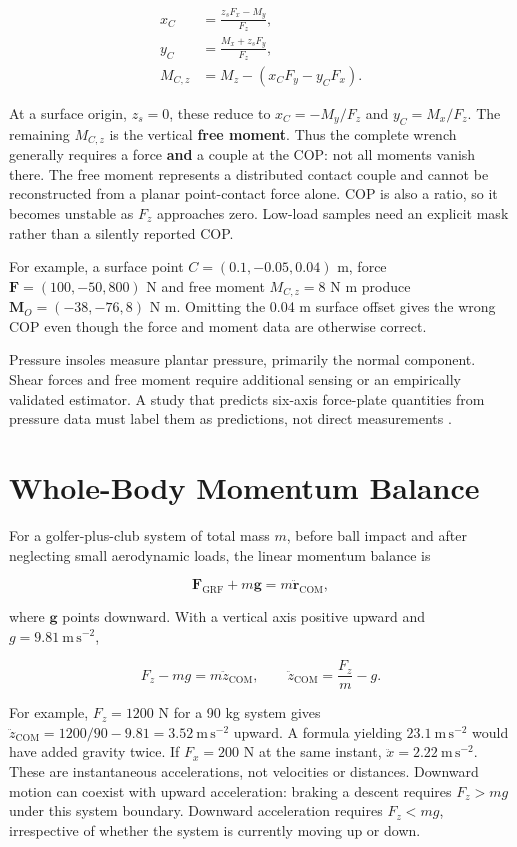 \[
\begin{aligned}
x_C&=\frac{z_sF_x-M_y}{F_z},\\
y_C&=\frac{M_x+z_sF_y}{F_z},\\
M_{C,z}&=M_z-(x_CF_y-y_CF_x).
\end{aligned}
\]

At a surface origin, \(z_s=0\), these reduce to \(x_C=-M_y/F_z\) and \(y_C=M_x/F_z\). The remaining \(M_{C,z}\) is the vertical \textbf{free moment}. Thus the complete wrench generally requires a force \textbf{and} a couple at the COP: not all moments vanish there. The free moment represents a distributed contact couple and cannot be reconstructed from a planar point-contact force alone. COP is also a ratio, so it becomes unstable as \(F_z\) approaches zero. Low-load samples need an explicit mask rather than a silently reported COP.

For example, a surface point \(C=(0.1,-0.05,0.04)\) m, force \(\bm F=(100,-50,800)\) N and free moment \(M_{C,z}=8\) N m produce \(\bm M_O=(-38,-76,8)\) N m. Omitting the 0.04 m surface offset gives the wrong COP even though the force and moment data are otherwise correct.

Pressure insoles measure plantar pressure, primarily the normal component. Shear forces and free moment require additional sensing or an empirically validated estimator. A study that predicts six-axis force-plate quantities from pressure data must label them as predictions, not direct measurements \citep{joo2016}.

\section{Whole-Body Momentum Balance}\label{sec:grf-impulse}\label{grf-whole-body-momentum-balance}

For a golfer-plus-club system of total mass \(m\), before ball impact and after neglecting small aerodynamic loads, the linear momentum balance is

\begin{equation}
\bm{F}_{\mathrm{GRF}}+m\bm{g}=m\ddot{\bm{r}}_{\mathrm{COM}},
\label{eq-grf-com}
\end{equation}

where \(\bm{g}\) points downward. With a vertical axis positive upward and \(g=9.81\ \mathrm{m\,s^{-2}}\),

\[
F_z-mg=m\ddot z_{\mathrm{COM}}, \qquad
\ddot z_{\mathrm{COM}}=\frac{F_z}{m}-g.
\]

For example, \(F_z=1200\) N for a 90 kg system gives \(\ddot z_{\mathrm{COM}}=1200/90-9.81=3.52\ \mathrm{m\,s^{-2}}\) upward. A formula yielding \(23.1\ \mathrm{m\,s^{-2}}\) would have added gravity twice. If \(F_x=200\) N at the same instant, \(\ddot x=2.22\ \mathrm{m\,s^{-2}}\). These are instantaneous accelerations, not velocities or distances. Downward motion can coexist with upward acceleration: braking a descent requires \(F_z>mg\) under this system boundary. Downward acceleration requires \(F_z<mg\), irrespective of whether the system is currently moving up or down.


